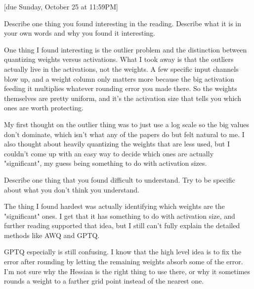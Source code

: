 \documentclass{article}
\begin{document}
[due Sunday, October 25 at 11:59PM]

\begin{probset}
\begin{prob}
    Describe one thing you found interesting in the reading. Describe what it is in your own words and why you found it interesting.

    \begin{soln}
        One thing I found interesting is the outlier problem and the distinction between quantizing weights versus activations. What I took away is that the outliers actually live in the activations, not the weights. A few specific input channels blow up, and a weight column only matters more because the big activation feeding it multiplies whatever rounding error you made there. So the weights themselves are pretty uniform, and it's the activation size that tells you which ones are worth protecting.

        My first thought on the outlier thing was to just use a log scale so the big values don't dominate, which isn't what any of the papers do but felt natural to me. I also thought about heavily quantizing the weights that are less used, but I couldn't come up with an easy way to decide which ones are actually "significant", my guess being something to do with activation sizes.
    \end{soln}
\end{prob}

\begin{prob}
    Describe one thing that you found difficult to understand. Try to be specific about what you don't think you understand.

    \begin{soln}
        The thing I found hardest was actually identifying which weights are the "significant" ones. I get that it has something to do with activation size, and further reading supported that idea, but I still can't fully explain the detailed methods like AWQ and GPTQ.

        GPTQ especially is still confusing. I know that the high level idea is to fix the error after rounding by letting the remaining weights absorb some of the error. I'm not sure why the Hessian is the right thing to use there, or why it sometimes rounds a weight to a farther grid point instead of the nearest one.
    \end{soln}
\end{prob}


\end{probset}
\end{document}
